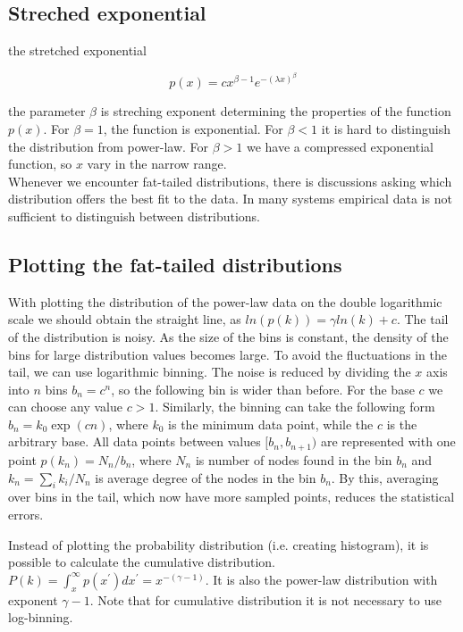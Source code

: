 \subsection{Streched exponential}

the stretched exponential 

\begin{equation}
p(x) = c x^{\beta - 1}e^{-(\lambda x)^{\beta}}
\end{equation}

 the parameter $\beta$ is streching exponent determining the properties of the function $p(x)$. For $\beta=1$, the function is exponential. For $\beta<1$ it is hard to distinguish the distribution from power-law. For $\beta>1$ we have a compressed exponential function, so $x$ vary in the narrow range. \\

Whenever we encounter fat-tailed distributions, there is discussions asking which distribution offers the best fit to the data. In many systems empirical data is not sufficient to distinguish between distributions. 

\subsection{Plotting the fat-tailed distributions}

With plotting the distribution of the power-law data on the double logarithmic scale we should obtain the straight line, as $ln(p(k)) = \gamma ln(k) + c$. The tail of the distribution is noisy. As the size of the bins is constant, the density of the bins for large distribution values becomes large. To avoid the fluctuations in the tail, we can use logarithmic binning. The noise is reduced by dividing the $x$ axis into $n$ bins $b_n = c^n$, so the following bin is wider than before. For the base $c$ we can choose any value $c>1$. Similarly, the binning can take the following form $b_n = k_0\exp{(cn)}$, where $k_0$ is the minimum data point, while the $c$ is the arbitrary base. All data points between values $[b_n, b_{n+1})$ are represented with one point $p(k_n) = N_n/b_n$, where $N_n$ is number of nodes found in the bin $b_n$ and $k_n = \sum_i k_i / N_n$ is average degree of the nodes in the bin $b_n$. By this, averaging over bins in the tail, which now have more sampled points, reduces the statistical errors.

Instead of plotting the probability distribution (i.e. creating histogram), it is possible to calculate the cumulative distribution. $P(k) = \int_{x}^{\infty} p(x^{'}) dx^{'} = x^{-(\gamma-1)}$. It is also the power-law distribution with exponent $\gamma-1$. Note that for cumulative distribution it is not necessary to use log-binning. 


